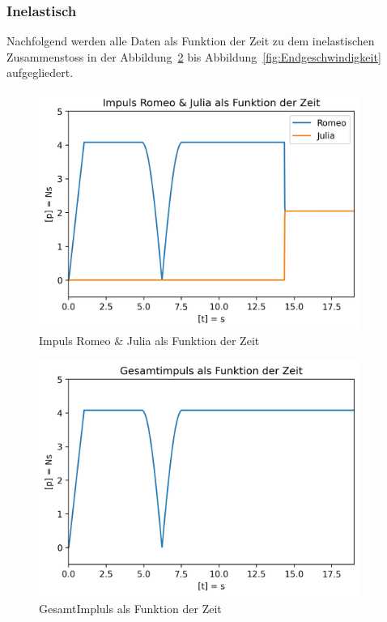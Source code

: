 \documentclass[../main.tex]{subfiles}
\begin{document}
    \newpage
    \subsubsection{Inelastisch}
    Nachfolgend werden alle Daten als Funktion der Zeit zu dem inelastischen Zusammenstoss in der
    Abbildung~\ref{fig:gesamtImpluls} bis Abbildung~\ref{fig:Endgeschwindigkeit}
    aufgegliedert.

    \begin{figure}[H]
        \begin{center}
            \centerline{\includegraphics[width=105mm]{./images/Inelastisch/ImpulsRomeoJulia}}
            \caption{Impuls Romeo \& Julia als Funktion der Zeit}
            \label{fig:ImpulsRomeoJulia}
        \end{center}
    \end{figure}

    \begin{figure}[H]
        \begin{center}
            \centerline{\includegraphics[width=105mm]{./images/Inelastisch/GesamtImpluls}}
            \caption{GesamtImpluls als Funktion der Zeit}
            \label{fig:gesamtImpluls}
        \end{center}
    \end{figure}
\end{document}
